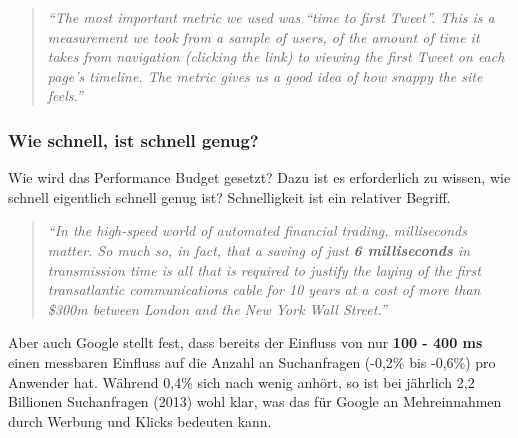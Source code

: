 				\begin{quote}
					\textit{"`The most important metric we used was “time to first Tweet”. This is a measurement we took from a sample of users, of the amount of time it takes from navigation (clicking the link) to viewing the first Tweet on each page’s timeline. The metric gives us a good idea of how snappy the site feels."'} \autocite{twitter12}
				\end{quote}


			\subsubsection{Wie schnell, ist schnell genug?} %
			\label{ssub:wie_schnell_ist_schnell_genug_}
				Wie wird das Performance Budget gesetzt? Dazu ist es erforderlich zu wissen, wie schnell eigentlich schnell genug ist? Schnelligkeit ist ein relativer Begriff.

				\begin{quote}
					\textit{"`In the high-speed world of automated financial trading, milliseconds matter. So much so, in fact, that a saving of just \textbf{6 milliseconds} in transmission time is all that is required to justify the laying of the first transatlantic communications cable for 10 years at a cost of more than \$300m between London and the New York Wall Street."'} \autocite[vgl.]{telegraph11}
				\end{quote}

				Aber auch Google stellt fest, dass bereits der Einfluss von nur \textbf{100 - 400 ms} einen messbaren Einfluss auf die Anzahl an Suchanfragen (-0,2\% bis -0,6\%) pro Anwender hat.\autocite{google09} Während 0,4\% sich nach wenig anhört, so ist bei jährlich 2,2 Billionen Suchanfragen (2013) wohl klar, was das für Google an Mehreinnahmen durch Werbung und Klicks bedeuten kann.\autocite{statista14}\\
					
